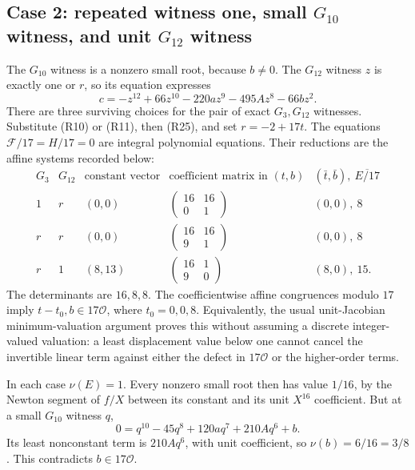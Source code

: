 \documentclass[
  british,
  10pt,
  a4paper,
]{article}
\begin{document}
\subsection{\texorpdfstring{Case 2: repeated witness one, small
\(G_{10}\) witness, and unit \(G_{12}\)
witness}{Case 2: repeated witness one, small G\_\{10\} witness, and unit G\_\{12\} witness}}\label{case-2-repeated-witness-one-small-g_10-witness-and-unit-g_12-witness}

The \(G_{10}\) witness is a nonzero small root, because \(b\neq0\). The
\(G_{12}\) witness \(z\) is exactly one or \(r\), so its equation
expresses \[
c=-z^{12}+66z^{10}-220az^9-495Az^8-66bz^2.                    \tag{R25}
\] There are three surviving choices for the pair of exact
\(G_3,G_{12}\) witnesses. Substitute (R10) or (R11), then (R25), and set
\(r=-2+17t\). The equations \(\mathcal F/17=H/17=0\) are integral
polynomial equations. Their reductions are the affine systems recorded
below: \[
\begin{array}{c|c|c|c|c}
G_3&G_{12}&\text{constant vector}&
\text{coefficient matrix in }(t,b)&
(\bar t,\bar b),\ \overline{E/17}\\ \hline
1&r&(0,0)&\begin{pmatrix}16&16\\0&1\end{pmatrix}&(0,0),\ 8\\
r&r&(0,0)&\begin{pmatrix}16&16\\9&1\end{pmatrix}&(0,0),\ 8\\
r&1&(8,13)&\begin{pmatrix}16&1\\9&0\end{pmatrix}&(8,0),\ 15.
\end{array}                                                  \tag{R26}
\] The determinants are \(16,8,8\). The coefficientwise affine
congruences modulo \(17\) imply \(t-t_0,b\in17\mathcal O\), where
\(t_0=0,0,8\). Equivalently, the usual unit-Jacobian minimum-valuation
argument proves this without assuming a discrete integer-valued
valuation: a least displacement value below one cannot cancel the
invertible linear term against either the defect in \(17\mathcal O\) or
the higher-order terms.

In each case \(\nu(E)=1\). Every nonzero small root then has value
\(1/16\), by the Newton segment of \(f/X\) between its constant and its
unit \(X^{16}\) coefficient. But at a small \(G_{10}\) witness \(q\), \[
0=q^{10}-45q^8+120aq^7+210Aq^6+b.
\] Its least nonconstant term is \(210Aq^6\), with unit coefficient, so
\(\nu(b)=6/16=3/8\). This contradicts \(b\in17\mathcal O\).
\end{document}
